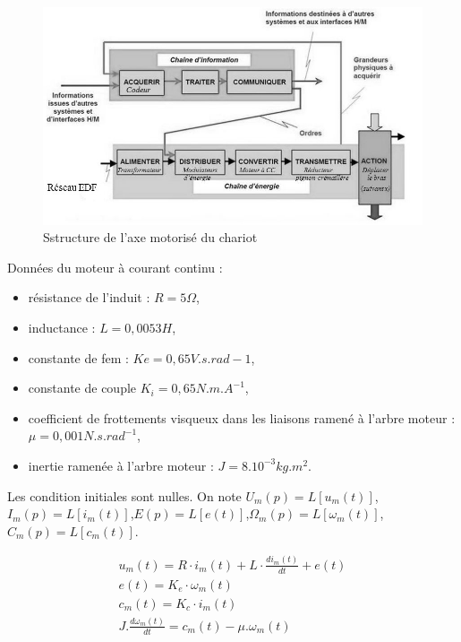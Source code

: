 \begin{figure}[ht!]
\begin{center}
 \includegraphics[width=0.8\linewidth]{img/fig007}
\end{center}
\label{fig007}
\caption{Sstructure de l’axe motorisé du chariot}
\end{figure}

\newpage

Données du moteur à courant continu : 
\begin{itemize}
 \item résistance de l’induit : $R=5\Omega$,
 \item inductance : $L=0,0053H$,
 \item constante de fem : $Ke=0,65V.s.rad-1$,
 \item constante de couple $K_i=0,65N.m.A^{-1}$,
 \item coefficient de frottements visqueux dans les liaisons ramené à l'arbre moteur : $\mu=0,001N.s.rad^{-1}$,
\item inertie ramenée à l’arbre moteur : $J=8.10^{-3}kg.m^2$.
\end{itemize}

Les condition initiales sont nulles. On note $U_m(p)=L[u_m(t)]$,$I_m(p)=L[i_m(t)]$,$E(p)=L[e(t)]$,$\Omega_m(p)=L[\omega_m(t)]$,$C_m(p)=L[c_m(t)]$.

\begin{eqnarray}
u_m(t)=R\cdot i_m(t)+L\cdot \frac{di_m(t)}{dt}+e(t) \\
e(t)=K_e\cdot \omega_m(t) \\
c_m(t)=K_c\cdot i_m(t) \\
J.\frac{d\omega_m(t)}{dt}=c_m(t)-\mu.\omega_m(t)
\end{eqnarray}



